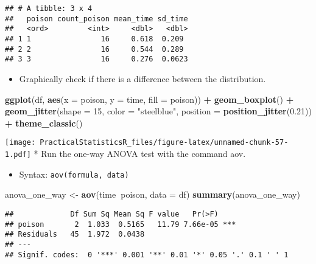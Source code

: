 \documentclass[
]{article}
\newenvironment{Shaded}{\begin{snugshade}}{\end{snugshade}}
\newcommand{\DataTypeTok}[1]{\textcolor[rgb]{0.13,0.29,0.53}{#1}}
\newcommand{\DecValTok}[1]{\textcolor[rgb]{0.00,0.00,0.81}{#1}}
\newcommand{\FloatTok}[1]{\textcolor[rgb]{0.00,0.00,0.81}{#1}}
\newcommand{\KeywordTok}[1]{\textcolor[rgb]{0.13,0.29,0.53}{\textbf{#1}}}
\newcommand{\NormalTok}[1]{#1}
\newcommand{\OperatorTok}[1]{\textcolor[rgb]{0.81,0.36,0.00}{\textbf{#1}}}
\newcommand{\StringTok}[1]{\textcolor[rgb]{0.31,0.60,0.02}{#1}}
\providecommand{\tightlist}{%
  \setlength{\itemsep}{0pt}\setlength{\parskip}{0pt}}
\begin{document}
\begin{verbatim}
## # A tibble: 3 x 4
##   poison count_poison mean_time sd_time
##   <ord>         <int>     <dbl>   <dbl>
## 1 1                16     0.618  0.209 
## 2 2                16     0.544  0.289 
## 3 3                16     0.276  0.0623
\end{verbatim}

\begin{itemize}
\tightlist
\item
  Graphically check if there is a difference between the distribution.
\end{itemize}

\begin{Shaded}
\begin{Highlighting}[]
\KeywordTok{ggplot}\NormalTok{(df, }\KeywordTok{aes}\NormalTok{(}\DataTypeTok{x =}\NormalTok{ poison, }\DataTypeTok{y =}\NormalTok{ time, }\DataTypeTok{fill =}\NormalTok{ poison)) }\OperatorTok{+}
\StringTok{  }\KeywordTok{geom_boxplot}\NormalTok{() }\OperatorTok{+}
\StringTok{  }\KeywordTok{geom_jitter}\NormalTok{(}\DataTypeTok{shape =} \DecValTok{15}\NormalTok{,}
              \DataTypeTok{color =} \StringTok{"steelblue"}\NormalTok{,}
              \DataTypeTok{position =} \KeywordTok{position_jitter}\NormalTok{(}\FloatTok{0.21}\NormalTok{)) }\OperatorTok{+}
\StringTok{  }\KeywordTok{theme_classic}\NormalTok{()}
\end{Highlighting}
\end{Shaded}

\texttt{[image: PracticalStatisticsR\_files/figure-latex/unnamed-chunk-57-1.pdf]}
* Run the one-way ANOVA test with the command aov.

\begin{itemize}
\tightlist
\item
  Syntax: \texttt{aov(formula,\ data)}
\end{itemize}

\begin{Shaded}
\begin{Highlighting}[]
\NormalTok{anova_one_way <-}\StringTok{ }\KeywordTok{aov}\NormalTok{(time}\OperatorTok{~}\NormalTok{poison, }\DataTypeTok{data =}\NormalTok{ df)}
\KeywordTok{summary}\NormalTok{(anova_one_way)}
\end{Highlighting}
\end{Shaded}

\begin{verbatim}
##             Df Sum Sq Mean Sq F value   Pr(>F)    
## poison       2  1.033  0.5165   11.79 7.66e-05 ***
## Residuals   45  1.972  0.0438                     
## ---
## Signif. codes:  0 '***' 0.001 '**' 0.01 '*' 0.05 '.' 0.1 ' ' 1
\end{verbatim}
\end{document}

